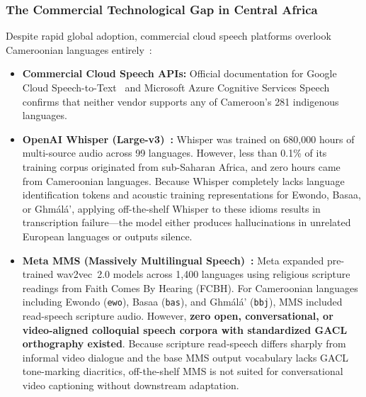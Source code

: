 \documentclass[a4paper,11pt]{article}
\begin{document}
\subsubsection{The Commercial Technological Gap in Central Africa}
\label{sec:chap2_asr_gap}
Despite rapid global adoption, commercial cloud speech platforms overlook Cameroonian languages entirely~\cite{joshi2020state}:
\begin{itemize}
    \item \textbf{Commercial Cloud Speech APIs:} Official documentation for Google Cloud Speech-to-Text~\cite{googlecloudspeech2026} and Microsoft Azure Cognitive Services Speech~\cite{azurespeech2026} confirms that neither vendor supports any of Cameroon's 281 indigenous languages.
    \item \textbf{OpenAI Whisper (Large-v3)~\cite{radford2023robust}:} Whisper was trained on 680,000 hours of multi-source audio across 99 languages. However, less than 0.1\% of its training corpus originated from sub-Saharan Africa, and zero hours came from Cameroonian languages. Because Whisper completely lacks language identification tokens and acoustic training representations for Ewondo, Basaa, or Gh\textopeno m\'al\'a', applying off-the-shelf Whisper to these idioms results in transcription failure---the model either produces hallucinations in unrelated European languages or outputs silence.
    \item \textbf{Meta MMS (Massively Multilingual Speech)~\cite{pratap2024scaling}:} Meta expanded pre-trained wav2vec~2.0 models across 1,400 languages using religious scripture readings from Faith Comes By Hearing (FCBH). For Cameroonian languages including Ewondo (\texttt{ewo}), Basaa (\texttt{bas}), and Gh\textopeno m\'al\'a' (\texttt{bbj}), MMS included read-speech scripture audio. However, \textbf{zero open, conversational, or video-aligned colloquial speech corpora with standardized GACL orthography existed}. Because scripture read-speech differs sharply from informal video dialogue and the base MMS output vocabulary lacks GACL tone-marking diacritics, off-the-shelf MMS is not suited for conversational video captioning without downstream adaptation.
\end{itemize}
\end{document}
